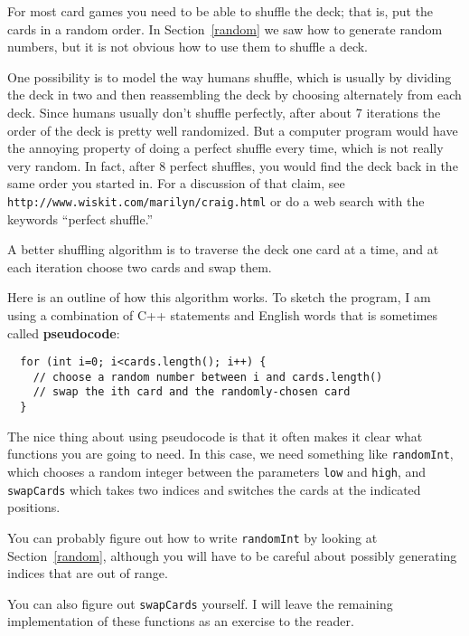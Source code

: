 For most card games you need to be able to shuffle the deck;
that is, put the cards in a random order.  In Section~\ref{random}
we saw how to generate random numbers, but it is not obvious how
to use them to shuffle a deck.

One possibility is to model the way humans shuffle, which is usually
by dividing the deck in two and then reassembling the deck by choosing
alternately from each deck.  Since humans usually don't shuffle
perfectly, after about 7 iterations the order of the deck is pretty
well randomized.  But a computer program would have the annoying
property of doing a perfect shuffle every time, which is not really
very random.  In fact, after 8 perfect shuffles, you would find the
deck back in the same order you started in.  For a discussion of that
claim, see {\tt http://www.wiskit.com/marilyn/craig.html} or do a web
search with the keywords ``perfect shuffle.''

A better shuffling algorithm is to traverse the deck one card at a
time, and at each iteration choose two cards and swap them.


Here is an outline of how this algorithm works.  To sketch the
program, I am using a combination of C++ statements and English
words that is sometimes called {\bf pseudocode}:

\begin{lstlisting}
  for (int i=0; i<cards.length(); i++) {
    // choose a random number between i and cards.length()
    // swap the ith card and the randomly-chosen card
  }
\end{lstlisting}
%
The nice thing about using pseudocode is that it often makes it
clear what functions you are going to need.  In this case, we
need something like {\tt randomInt}, which chooses a random
integer between the parameters {\tt low} and {\tt high},
and {\tt swapCards} which takes two indices and switches the
cards at the indicated positions.


You can probably figure out how to write {\tt randomInt}
by looking at Section~\ref{random}, although you will have to
be careful about possibly generating indices that are out of range.


You can also figure out {\tt swapCards} yourself.
I will leave the remaining implementation of these functions
as an exercise to the reader.

